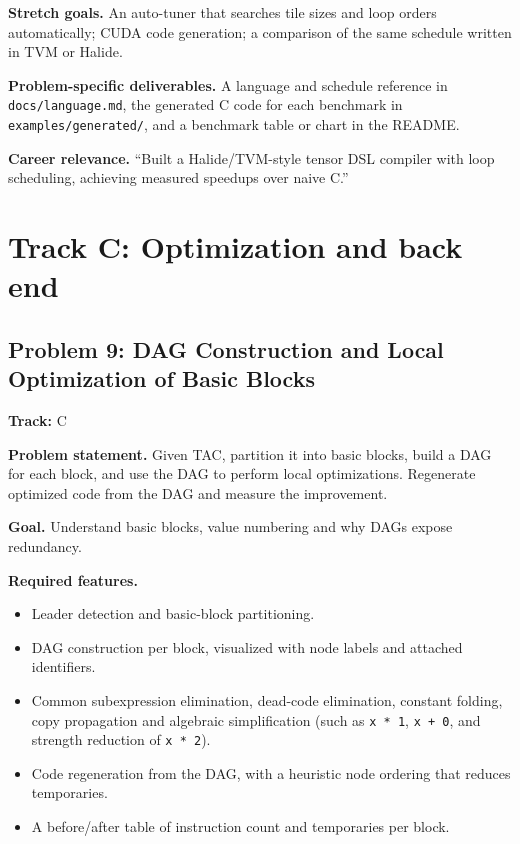 \documentclass[11pt,a4paper]{article}
\newcommand{\fld}[1]{\par\smallskip\textbf{\color{accent}#1}\quad}
\newcommand{\meta}[1]{%
  \begin{tcolorbox}[colback=softbg,colframe=softbg,boxsep=2pt,left=4pt,right=4pt,top=2pt,bottom=2pt,arc=2pt]
  \small\textbf{Track:} #1
  \end{tcolorbox}}
\begin{document}
\fld{Stretch goals.} An auto-tuner that searches tile sizes and loop orders automatically; CUDA code
generation; a comparison of the same schedule written in TVM or Halide.

\fld{Problem-specific deliverables.} A language and schedule reference in \texttt{docs/language.md},
the generated C code for each benchmark in \texttt{examples/generated/}, and a benchmark table or chart in the README.

\fld{Career relevance.} ``Built a Halide/TVM-style tensor DSL compiler with loop scheduling, achieving measured speedups over naive C.''

\section{Track C: Optimization and back end}

\subsection{Problem 9: DAG Construction and Local Optimization of Basic Blocks}
\meta{C}

\fld{Problem statement.} Given TAC, partition it into basic blocks, build a DAG for each block, and use
the DAG to perform local optimizations. Regenerate optimized code from the DAG and measure the improvement.

\fld{Goal.} Understand basic blocks, value numbering and why DAGs expose redundancy.

\fld{Required features.}
\begin{itemize}
  \item Leader detection and basic-block partitioning.
  \item DAG construction per block, visualized with node labels and attached identifiers.
  \item Common subexpression elimination, dead-code elimination, constant folding, copy propagation and algebraic simplification (such as \texttt{x * 1}, \texttt{x + 0}, and strength reduction of \texttt{x * 2}).
  \item Code regeneration from the DAG, with a heuristic node ordering that reduces temporaries.
  \item A before/after table of instruction count and temporaries per block.
\end{itemize}
\end{document}
